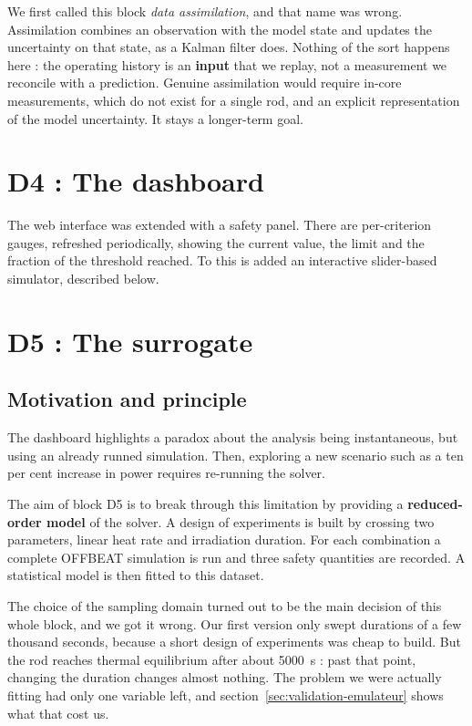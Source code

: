 We first called this block \emph{data assimilation}, and that name was wrong.
Assimilation combines an observation with the model state and updates the
uncertainty on that state, as a Kalman filter does. Nothing of the sort happens
here : the operating history is an \textbf{input} that we replay, not a
measurement we reconcile with a prediction. Genuine assimilation would require
in-core measurements, which do not exist for a single rod, and an explicit
representation of the model uncertainty. It stays a longer-term goal.

\section{D4 : The dashboard}

The web interface was extended with a safety panel. There are per-criterion gauges,
refreshed periodically, showing the current value, the limit and the fraction of
the threshold reached. To this is added an interactive slider-based simulator,
described below.

\section{D5 : The surrogate}

\subsection{Motivation and principle}


The dashboard highlights a paradox about the analysis being instantaneous, but using an already runned simulation.
Then, exploring a new scenario such as a ten per cent increase in power requires re-running the
solver.

The aim of block D5 is to break through this limitation by providing a \textbf{reduced-order model} of the solver.
A design of experiments is built by crossing two
parameters, linear heat rate and irradiation duration. For each combination a
complete OFFBEAT simulation is run and three safety quantities are recorded. A
statistical model is then fitted to this dataset.

The choice of the sampling domain turned out to be the main decision of this
whole block, and we got it wrong. Our first version only swept durations of a few
thousand seconds, because a short design of experiments was cheap to build. But
the rod reaches thermal equilibrium after about \SI{5000}{\second} : past that
point, changing the duration changes almost nothing. The problem we were actually
fitting had only one variable left, and section~\ref{sec:validation-emulateur}
shows what that cost us.



